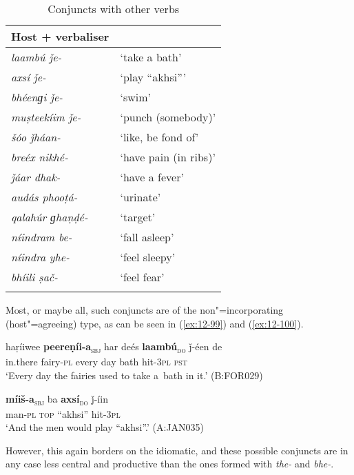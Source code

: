 \begin{table}[ht]
\caption{Conjuncts with other verbs}
\begin{tabularx}{.75\textwidth}{ l@{\hspace{45pt}} Q }
\lspbottomrule
\textbf{Host + verbaliser} &
\\\midrule
\textit{laambú ǰe-} &
`take a bath'\\
\textit{axsí ǰe-} &
`play ``akhsi'''\\
\textit{bhéenɡi ǰe-} &
`swim'\\
\textit{muṣteekíim ǰe-} &
`punch (somebody)'\\
\textit{šóo ǰháan-} &
`like, be fond of'\\
\textit{breéx nikhé-} &
`have pain (in ribs)'\\
\textit{ǰáar dhak-} &
`have a fever'\\
\textit{audás phooṭá-} &
`urinate'\\
\textit{qalahúr ɡhaṇḍé-} &
`target'\\
\textit{níindram be-} &
`fall asleep'\\
\textit{níindra yhe-} &
`feel sleepy'\\
\textit{bhíili ṣač-} &
`feel fear'\\\lspbottomrule
\end{tabularx}
\label{tab:12-9}
\end{table}


Most, or maybe all, such conjuncts are of the non"=incorporating (host"=agreeing) type, as can be seen in (\ref{ex:12-99}) and (\ref{ex:12-100}). 

\begin{exe}
\ex
\label{ex:12-99}
\gll haṛíiwee {\ob}\textbf{peereṇíi-a}{\cb}\textsubscript{\textsc{\upshape sbj}} har deés {\ob}\textbf{laambú}{\cb}\textsubscript{\textsc{\upshape do}} ǰ-éen de\\
in.there fairy-\textsc{pl} every day bath hit-\textsc{3pl} \textsc{pst}\\
\glt `Every day the fairies used to take a~bath in it.' (B:FOR029)
\end{exe}
\begin{exe}
\ex
\label{ex:12-100}
\gll {\ob}\textbf{míiš-a}{\cb}\textsubscript{\textsc{\upshape sbj}} ba {\ob}\textbf{axsí}{\cb}\textsubscript{\textsc{\upshape do}} ǰ-íin\\
man-\textsc{pl} \textsc{top} ``akhsi'' hit-\textsc{3pl}\\
\glt `And the men would play ``akhsi''.' (A:JAN035)
\end{exe}

However, this again borders on the idiomatic, and these possible conjuncts are in any case less central and productive than the ones formed with \textit{the-} and \textit{bhe-}.